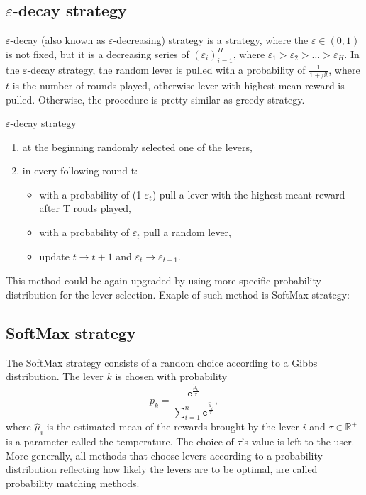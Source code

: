 \documentclass[11pt,american,czech]{article}
\newcommand{\e}{\mathtt{e}} %
\newcommand{\R}{\mathbb{R}} %
\begin{document}
	\subsection*{$\varepsilon$-decay strategy}
	$\varepsilon$-decay (also known as $\varepsilon$-decreasing) strategy is a strategy, where the $\varepsilon\in(0,1)$ is not fixed, but it is a decreasing series of $(\varepsilon_i)_{i=1}^H$, where $\varepsilon_1>\varepsilon_2>\dots>\varepsilon_H$. In the $\varepsilon$-decay strategy, the random lever is pulled with a probability of $\frac{1}{1+\beta t}$, where $t$ is the number of rounds played, otherwise lever with highest mean reward is pulled. Otherwise, the procedure is pretty similar as greedy strategy.
	\begin{tcolorbox}[colframe=white]
		$\varepsilon$-decay strategy
		\begin{enumerate}
			\item at the beginning randomly selected one of the levers,
			\item in every following round t:
			\begin{itemize}
				\item with a probability of (1-$\varepsilon_t$) pull a lever with the highest meant reward after T rouds played,
				\item with a probability of $\varepsilon_t$ pull a random lever,
				\item update $t\to t+1$ and $\varepsilon_t\to\varepsilon_{t+1}$.
			\end{itemize}
		\end{enumerate}
	\end{tcolorbox}
	This method could be again upgraded by using more specific probability distribution for the lever selection. Exaple of such method is SoftMax strategy: 
	
	\subsection*{SoftMax strategy}
	The SoftMax strategy consists of a random choice according to a Gibbs distribution. The lever $k$ is chosen with probability 
	$$p_k =\frac{\e^{\frac{\hat{\mu}_k}{\tau}}}{\sum_{i=1}^{n}\e^{\frac{\hat{\mu}_i}{\tau}}},$$
	where $\hat{\mu}_i$ is the estimated mean of the rewards brought by the lever $i$ and $\tau\in\R^+$ is a parameter called the temperature. The choice of $\tau$’s value is left to the user. More generally, all methods that choose levers according to a probability distribution reflecting how likely the levers are to be optimal, are called probability matching methods.
\end{document}
